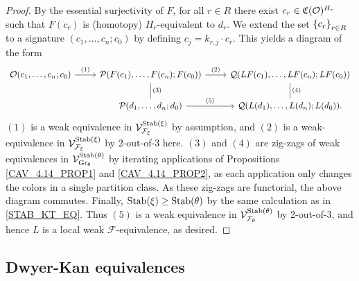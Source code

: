 \documentclass[a4paper,10pt
,draft
]{article}%
\renewcommand{\F}{\mathcal F}
\newcommand{\Q}{\mathcal Q}
\renewcommand{\1}{\ensuremath{\mathbb{id}}}
\begin{document}
\begin{proof}
      By the essential surjectivity of $F$, for all $r \in R$ there exist $c_r \in \mathfrak C(\mathcal{O})^{H_r}$ such that
      $F(c_r)$ is (homotopy) $H_r$-equivalent to $d_r$.
      We extend the set $\left\{c_r\right\}_{r\in R}$ to a signature $(c_1,\ldots, c_n;c_0)$
      by defining $c_j = k_{r,j} \cdot c_r$.
      This yields a diagram of the form
      \begin{equation}
            \label{TWOOFTHREE_EQ}
            \begin{tikzcd}
                  \O(c_1,\ldots, c_n;c_0) \arrow[r, "(1)"]
                  &
                  \P(F(c_1),\ldots, F(c_n); F(c_0)) \arrow[d,dash, "(3)"] \arrow[r, "(2)"]
                  &
                  \Q(LF(c_1),\ldots, LF(c_n);LF(c_0)) \arrow[d, dash, "(4)"]
                  \\
                  &
                  \P(d_1,\ldots, d_n;d_0) \arrow[r, "(5)"]
                  &
                  \Q(L(d_1),\ldots, L(d_n); L(d_0)).
            \end{tikzcd}
      \end{equation}
      $(1)$ is a weak equivalence in $\V^{\Stab(\ksi)}_{\F_\ksi}$ by assumption, and
      $(2)$ is a weak-equivalence in $\V^{\Stab(\ksi)}_{\F_\ksi}$ by 2-out-of-3 here.
      $(3)$ and $(4)$ are zig-zags of weak equivalences in $\mathcal V^{\mathrm{Stab}(\theta)}_{\mathrm{Gr}_\theta}$ by iterating applications of
      Propositions \ref{CAV_4.14_PROP1} and \ref{CAV_4.14_PROP2},
      as each application only changes the colors in a single partition class.
      As these zig-zags are functorial, the above diagram commutes.
      Finally, $\mathrm{Stab}(\xi) \geq \mathrm{Stab}(\theta)$ by the same calculation as in \eqref{STAB_KT_EQ}.
      Thus $(5)$ is a weak equivalence in $\V^{\Stab(\theta)}_{\F_\theta}$ by 2-out-of-3, and hence
      $L$ is a local weak $\F$-equivalence, as desired.
\end{proof}




\subsection{Dwyer-Kan equivalences}
\end{document}
